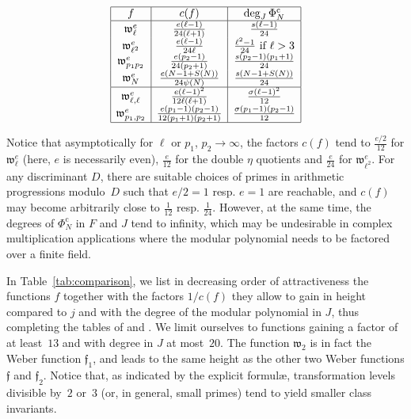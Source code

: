 \documentclass[12pt,twoside,leqno]{article}
\numberwithin{equation}{section}
\newcommand{\w}{\mathfrak w}
\newcommand{\wf}{\mathfrak{f}}
\newcommand{\wfone}{\mathfrak{f}_1}
\newcommand{\wftwo}{\mathfrak{f}_2}
\newcommand {\PhiNc}{\Phi_N^{\mathrm c}}
\begin{document}
{
\renewcommand {\arraystretch}{1.4}
$$\begin{array}{|c|c|c|}\hline
f & c(f) & \deg_J \PhiNc \\ \hline
\w_{\ell}^e      & \frac {e (\ell-1)}{24 (\ell+1)} & \frac{s
(\ell-1)}{24} \\
\w_{\ell^2}^e    & \frac {e (\ell-1)}{24 \ell} & \frac{\ell^2-1}{24}
\text{ if } \ell > 3\\
\w_{p_1 p_2}^e   & \frac {e (p_2-1)}{24 (p_2 + 1)} & \frac{s
(p_2-1)(p_1+1)}{24} \\
\w_N^e           & \frac {e (N-1+S(N))}{24 \psi (N)} & \frac{s
(N-1+S(N))}{24}\\
\hline
\w_{\ell, \ell}^e & \frac {e (\ell-1)^2}{12 \ell (\ell + 1)} &
\frac{\sigma (\ell-1)^2}{12} \\
\w_{p_1, p_2}^e   & \frac {e (p_1-1)(p_2-1)}{12 (p_1 + 1)(p_2 + 1)} &
\frac{\sigma (p_1-1) (p_2-1)}{12}\\
\hline
\end{array}$$
}

Notice that asymptotically for $\ell$ or $p_1$, $p_2 \to \infty$,
the factors $c (f)$ tend to $\frac {e/2}{12}$ for $\w_\ell^e$ (here,
$e$ is necessarily even), $\frac {e}{12}$ for the double $\eta$ quotients
and $\frac {e}{24}$ for $\w_{\ell^2}^e$. For any discriminant $D$, there
are suitable choices of primes in arithmetic progressions modulo~$D$
such that $e/2 = 1$ resp. $e = 1$ are reachable, and $c (f)$ may become
arbitrarily close to $\frac {1}{12}$ resp. $\frac {1}{24}$. However,
at the same time, the degrees of $\PhiNc$ in $F$ and $J$ tend to
infinity, which may be undesirable in complex multiplication
applications where the modular polynomial needs to be factored
over a finite field.

In Table~\ref {tab:comparison}, we list in decreasing order of
attractiveness the
functions $f$ together with the factors $1 / c (f)$ they allow
to gain in height compared to $j$ and with the degree of the modular
polynomial in $J$, thus completing the tables of \cite{EnMo02} and
\cite[p.~21]{Enge07}. We limit ourselves to functions gaining a factor
of at least~$13$ and with degree in $J$ at most~$20$.
The function $\w_2$ is in fact the Weber function $\wfone$,
and leads to the same height as the other two Weber functions
$\wf$ and $\wftwo$.
Notice that, as indicated by the explicit formul{\ae}, transformation
levels divisible by~$2$ or~$3$ (or, in general, small primes)
tend to yield smaller class invariants.
\end{document}
